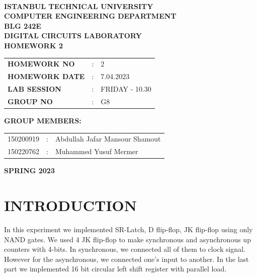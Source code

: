 \documentclass[pdftex,12pt,a4paper]{article}
\begin{document}
\begin{titlepage}
\begin{center}
\textbf{}\\
\textbf{\Large{ISTANBUL TECHNICAL UNIVERSITY}}\\
\vspace{0.5cm}
\textbf{\Large{COMPUTER ENGINEERING DEPARTMENT}}\\
\vspace{2cm}
\textbf{\Large{BLG 242E\\ DIGITAL CIRCUITS LABORATORY\\ HOMEWORK 2}}\\
\vspace{2.8cm}
\begin{table}[ht]
\centering
\Large{
\begin{tabular}{lcl}
\textbf{HOMEWORK NO}  & : & 2 \\
\textbf{HOMEWORK DATE}  & : & 7.04.2023\\
\textbf{LAB SESSION}  & : & FRIDAY - 10.30 \\
\textbf{GROUP NO}  & : & G8 \\
\end{tabular}}
\end{table}
\vspace{1cm}
\textbf{\Large{GROUP MEMBERS:}}\\
\begin{table}[ht]
\centering
\Large{
\begin{tabular}{rcl}
150200919  & : & Abdullah Jafar Mansour Shamout \\
150220762  & : & Muhammed Yusuf Mermer  \\
\end{tabular}}
\end{table}
\vspace{2.8cm}
\textbf{\Large{SPRING 2023}}

\end{center}

\end{titlepage}

\thispagestyle{empty}
\setcounter{tocdepth}{4}
\tableofcontents
\clearpage

\setcounter{page}{1}

\section{INTRODUCTION}
In this experiment we implemented SR-Latch, D flip-flop, JK flip-flop using only NAND gates. We used 4 JK flip-flop to make synchronous and asynchronous up counters with 4-bits. In synchronous, we connected all of them to clock signal. However for the asynchronous, we connected one's input to another. In the last part we implemented 16 bit circular left shift register with parallel load.
\end{document}
